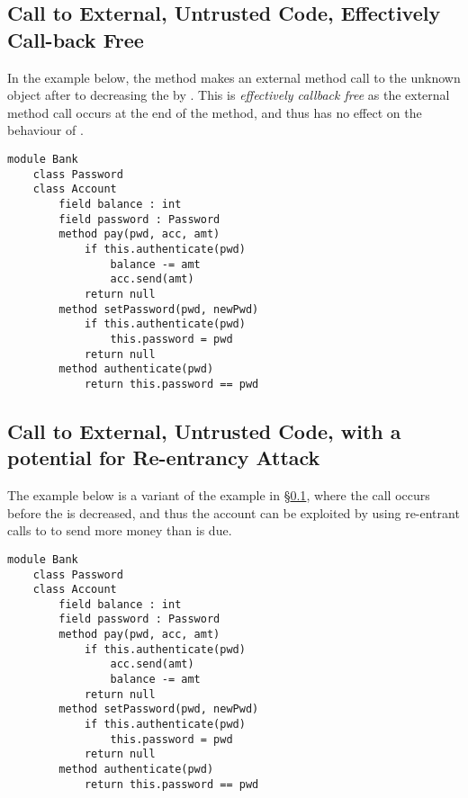 \documentclass[11pt]{article} %
\theoremstyle{definition}
\begin{document}
\subsection{Call to External, Untrusted Code, Effectively Call-back Free}
\label{s:ex1}
In the example below, the  method makes an external method call  to the unknown object 
after to decreasing the  by . This is \emph{effectively callback free} as the external method 
call occurs at the end of the method, and thus  has no effect on the behaviour of .
\begin{lstlisting}[language = Chainmail, mathescape=true, frame=lines]
module Bank
	class Password
	class Account
		field balance : int
		field password : Password
		method pay(pwd, acc, amt)
			if this.authenticate(pwd)
				balance -= amt
				acc.send(amt)
			return null
		method setPassword(pwd, newPwd)
			if this.authenticate(pwd)
				this.password = pwd
			return null
		method authenticate(pwd)
			return this.password == pwd
\end{lstlisting}

\subsection{Call to External, Untrusted Code, with a potential for Re-entrancy Attack}
The example below is a variant of the example in \S \ref{s:ex1}, where the call 
occurs before the  is decreased, and thus the account can be exploited by 
using re-entrant calls to  to send more money than is due.
\begin{lstlisting}[language = Chainmail, mathescape=true, frame=lines]
module Bank
	class Password
	class Account
		field balance : int
		field password : Password
		method pay(pwd, acc, amt)
			if this.authenticate(pwd)
				acc.send(amt)
				balance -= amt
			return null
		method setPassword(pwd, newPwd)
			if this.authenticate(pwd)
				this.password = pwd
			return null
		method authenticate(pwd)
			return this.password == pwd
\end{lstlisting}
\end{document}
